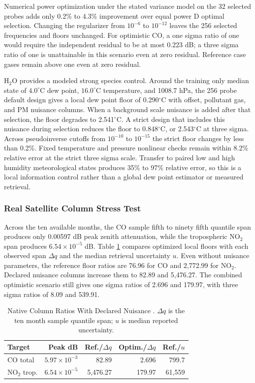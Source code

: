 \documentclass[conference]{IEEEtran}
\begin{document}
Numerical power optimization under the stated variance model on the 32 selected probes adds only 0.2\% to 4.3\% improvement over equal power D optimal selection. Changing the regularizer from $10^{-6}$ to $10^{-12}$ leaves the 256 selected frequencies and floors unchanged. For optimistic CO, a one sigma ratio of one would require the independent residual to be at most 0.223 dB; a three sigma ratio of one is unattainable in this scenario even at zero residual. Reference case gases remain above one even at zero residual.

H$_2$O provides a modeled strong species control. Around the training only median state of $4.0^\circ$C dew point, $16.0^\circ$C temperature, and 1008.7 hPa, the 256 probe default design gives a local dew point floor of 0.290$^\circ$C with offset, pollutant gas, and PM nuisance columns. When a background scale nuisance is added after that selection, the floor degrades to 2.541$^\circ$C. A strict design that includes this nuisance during selection reduces the floor to 0.848$^\circ$C, or 2.543$^\circ$C at three sigma. Across pseudoinverse cutoffs from $10^{-10}$ to $10^{-15}$ the strict floor changes by less than 0.2\%. Fixed temperature and pressure nonlinear checks remain within 8.2\% relative error at the strict three sigma scale. Transfer to paired low and high humidity meteorological states produces 35\% to 97\% relative error, so this is a local information control rather than a global dew point estimator or measured retrieval.

\subsubsection{Real Satellite Column Stress Test}

Across the ten available months, the CO sample fifth to ninety fifth quantile span produces only 0.00597 dB peak zenith attenuation, while the tropospheric NO$_2$ span produces $6.54\times10^{-5}$ dB. Table \ref{tab:columns} compares optimized local floors with each observed span $\Delta q$ and the median retrieval uncertainty $u$. Even without nuisance parameters, the reference floor ratios are 76.96 for CO and 2,772.99 for NO$_2$. Declared nuisance columns increase them to 82.89 and 5,476.27. The combined optimistic scenario still gives one sigma ratios of 2.696 and 179.97, with three sigma ratios of 8.09 and 539.91.

\begin{table}[t]
\caption{Native Column Ratios With Declared Nuisance \cite{esacciCO,esacciNO2}. $\Delta q$ is the ten month sample quantile span; $u$ is median reported uncertainty.}
\label{tab:columns}
\centering
\scriptsize
\setlength{\tabcolsep}{1.5pt}
\begin{tabular}{@{}lrrrr@{}}
\toprule
Target & Peak dB & Ref./$\Delta q$ & Optim./$\Delta q$ & Ref./$u$ \\
\midrule
CO total & $5.97\!\times\!10^{-3}$ & 82.89 & 2.696 & 799.7 \\
NO$_2$ trop. & $6.54\!\times\!10^{-5}$ & 5,476.27 & 179.97 & 61,559 \\
\bottomrule
\end{tabular}
\end{table}
\end{document}

